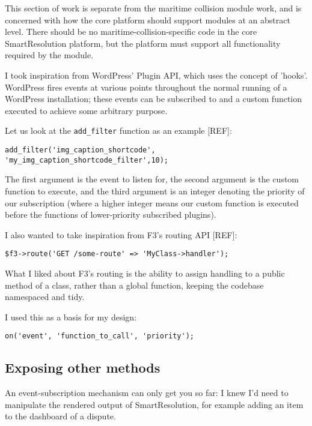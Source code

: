 This section of work is separate from the maritime collision module work, and is concerned with how the core platform should support modules at an abstract level. There should be no maritime-collision-specific code in the core SmartResolution platform, but the platform must support all functionality required by the module.

I took inspiration from WordPress' Plugin API, which uses the concept of 'hooks'. WordPress fires events at various points throughout the normal running of a WordPress installation; these events can be subscribed to and a custom function executed to achieve some arbitrary purpose.

Let us look at the \lstinline{add_filter} function as an example [REF]: %

\begin{lstlisting}
add_filter('img_caption_shortcode', 'my_img_caption_shortcode_filter',10);
\end{lstlisting}

The first argument is the event to listen for, the second argument is the custom function to execute, and the third argument is an integer denoting the priority of our subscription (where a higher integer means our custom function is executed before the functions of lower-priority subscribed plugins).

I also wanted to take inspiration from F3's routing API [REF]:

\begin{lstlisting}
$f3->route('GET /some-route' => 'MyClass->handler');
\end{lstlisting}

What I liked about F3's routing is the ability to assign handling to a public method of a class, rather than a global function, keeping the codebase namespaced and tidy.

I used this as a basis for my design:

\begin{lstlisting}
on('event', 'function_to_call', 'priority');
\end{lstlisting}

\subsection{Exposing other methods}

An event-subscription mechanism can only get you so far: I knew I'd need to manipulate the rendered output of SmartResolution, for example adding an item to the dashboard of a dispute.

